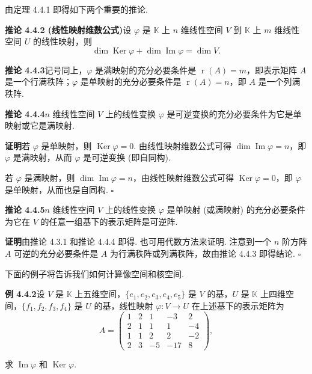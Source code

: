 \documentclass[UTF8, 12pt, fontset=fandol, oneside]{ctexart}
\begin{document}
由定理 4.4.1 即得如下两个重要的推论.

\noindent\textbf{推论 4.4.2 (线性映射维数公式)}\quad 设 $\varphi$ 是 $\mathbb{K}$ 上 $n$ 维线性空间 $V$ 到 $\mathbb{K}$ 上 $m$ 维线性空间 $U$ 的线性映射，则
\[
\dim\operatorname{Ker}\varphi+\dim\operatorname{Im}\varphi=\dim V.
\]

\noindent\textbf{推论 4.4.3}\quad 记号同上，$\varphi$ 是满映射的充分必要条件是 $\operatorname{r}(A)=m$，即表示矩阵 $A$ 是一个行满秩阵；$\varphi$ 是单映射的充分必要条件是 $\operatorname{r}(A)=n$，即 $A$ 是一个列满秩阵.

\noindent\textbf{推论 4.4.4}\quad $n$ 维线性空间 $V$ 上的线性变换 $\varphi$ 是可逆变换的充分必要条件为它是单映射或它是满映射.

\noindent\textbf{证明}\quad 若 $\varphi$ 是单映射，则 $\operatorname{Ker}\varphi=0$. 由线性映射维数公式可得 $\dim\operatorname{Im}\varphi=n$，即 $\varphi$ 是满映射，从而 $\varphi$ 是可逆变换 (即自同构).

若 $\varphi$ 是满映射，则 $\dim\operatorname{Im}\varphi=n$，由线性映射维数公式可得 $\operatorname{Ker}\varphi=0$，即 $\varphi$ 是单映射，从而也是自同构. $\square$

\noindent\textbf{推论 4.4.5}\quad $n$ 维线性空间 $V$ 上的线性变换 $\varphi$ 是单映射 (或满映射) 的充分必要条件为它在 $V$ 的任意一组基下的表示矩阵是可逆阵.

\noindent\textbf{证明}\quad 由推论 4.3.1 和推论 4.4.4 即得. 也可用代数方法来证明. 注意到一个 $n$ 阶方阵 $A$ 可逆的充分必要条件是 $A$ 为行满秩阵或列满秩阵，故由推论 4.4.3 即得结论. $\square$

下面的例子将告诉我们如何计算像空间和核空间.

\noindent\textbf{例 4.4.2}\quad 设 $V$ 是 $\mathbb{K}$ 上五维空间，$\{e_1,e_2,e_3,e_4,e_5\}$ 是 $V$ 的基，$U$ 是 $\mathbb{K}$ 上四维空间，$\{f_1,f_2,f_3,f_4\}$ 是 $U$ 的基，线性映射 $\varphi:V\to U$ 在上述基下的表示矩阵为
\[
A=
\left(\begin{array}{rrrrr}
1 & 2 & 1 & -3 & 2\\
2 & 1 & 1 & 1 & -4\\
1 & 1 & 2 & 2 & -2\\
2 & 3 & -5 & -17 & 8
\end{array}\right),
\]

求 $\operatorname{Im}\varphi$ 和 $\operatorname{Ker}\varphi$.
\end{document}
